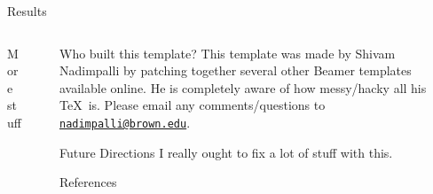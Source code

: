 \documentclass[final]{beamer}
\newlength{\sepwid}
\newlength{\threecolwid}
\newlength{\onehalf}
\begin{document}
\begin{frame}[t]
\begin{columns}[t]
\begin{column}{\threecolwid}
\begin{columns}[t,totalwidth=2\onehalf]
\begin{column}{\onehalf}
\begin{block}{Results}

\lipsum[66]

\lipsum[5]
	
\end{block}







	
	    
\end{column}
 
\end{columns}

\vspace{1cm}


\begin{columns}[t,totalwidth=2\onehalf]	%

\begin{column}{\onehalf}

\begin{block}{More stuff}


	
\end{block}






\end{column}

\begin{column}{\sepwid} \vrule \end{column}	

\begin{column}{\onehalf}


\begin{block}{Who built this template?}
This template was made by Shivam Nadimpalli by patching together several other Beamer templates available online. He is completely aware of how messy/hacky all his \TeX\ is. Please email any comments/questions to \href{mailto:nadimpalli@brown.edu}{\texttt{nadimpalli@brown.edu}}.
\end{block}

\begin{alertblock}{Future Directions}
I really ought to fix a lot of stuff with this. 
\end{alertblock}


\begin{block}{References}


\end{block}
\end{column}
\end{columns}
\end{column}
\end{columns}
\end{frame}
\end{document}
